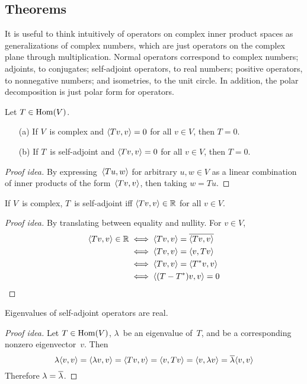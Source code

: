 \subsection*{Theorems}
\begin{rmk}
It is useful to think intuitively of operators on complex inner product spaces as generalizations of complex numbers, which are just operators on the complex plane through multiplication. Normal operators correspond to complex numbers; adjoints, to conjugates; self-adjoint operators, to real numbers; positive operators, to nonnegative numbers; and isometries, to the unit circle. In addition, the polar decomposition is just polar form for operators.
\end{rmk}
\begin{thm}[Definiteness]
Let \(T\in\operatorname{Hom}(V)\).
\begin{enumerate}[itemsep=0pt]
\item[(a)] If \(V\)~is complex and \(\langle{Tv},{v}\rangle=0\) for all \(v\in V\), then \(T=0\).
\item[(b)] If \(T\)~is self-adjoint and \(\langle{Tv},{v}\rangle=0\) for all \(v\in V\), then \(T=0\).
\end{enumerate}
\end{thm}
\begin{proof}[Proof idea]
By expressing~\(\langle{Tu},{w}\rangle\) for arbitrary \(u,w\in V\) as a linear combination of inner products of the form~\(\langle{Tv},{v}\rangle\), then taking \(w=Tu\).
\end{proof}
\begin{cor}
If \(V\)~is complex, \(T\)~is self-adjoint iff \(\langle{Tv},{v}\rangle\in\mathbb{R}\) for all \(v\in V\).
\end{cor}
\begin{proof}[Proof idea]
By translating between equality and nullity. For \(v\in V\),
\begin{align*}
\langle{Tv},{v}\rangle\in\mathbb{R}&\iff\langle{Tv},{v}\rangle=\overline{\langle{Tv},{v}\rangle}\\
	&\iff\langle{Tv},{v}\rangle=\langle{v},{Tv}\rangle\\
	&\iff\langle{Tv},{v}\rangle=\langle{T^*v},{v}\rangle\\
	&\iff\langle{(T-T^*)v},{v}\rangle=0\qedhere
\end{align*}
\end{proof}

\begin{thm}
Eigenvalues of self-adjoint operators are real.
\end{thm}
\begin{proof}[Proof idea]
Let \(T\in\operatorname{Hom}(V)\), \(\lambda\)~be an eigenvalue of~\(T\), and be a corresponding nonzero eigenvector~\(v\). Then
\[\lambda\langle{v},{v}\rangle=\langle{\lambda v},{v}\rangle=\langle{Tv},{v}\rangle=\langle{v},{Tv}\rangle=\langle{v},{\lambda v}\rangle=\overline{\lambda}\langle{v},{v}\rangle\]
Therefore \(\lambda=\overline{\lambda}\).
\end{proof}

